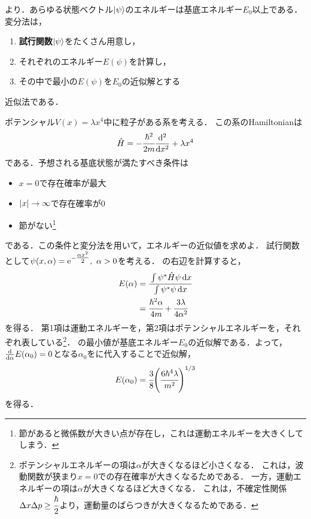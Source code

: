 \documentclass{report}
\begin{document}
  より．あらゆる状態ベクトル$\ket{\psi}$のエネルギーは基底エネルギー$E_0$以上である．
  変分法は，
  \begin{screen}
    \begin{enumerate}
      \item \textbf{試行関数}$\ket{\psi}$をたくさん用意し，
      \item それぞれのエネルギー$E(\psi)$を計算し，
      \item その中で最小の$E(\psi)$を$E_0$の近似解とする
    \end{enumerate}
  \end{screen}
  近似法である．
  \begin{myex}{}{}
    ポテンシャル$V(x)=\lambda x^4$中に粒子がある系を考える．
    この系のHamiltonianは
    \begin{align}
      \hat{H} = -\cfrac{\hbar^2}{2m}\dv[2]{x} + \lambda x^4
    \end{align}
    である．予想される基底状態が満たすべき条件は
    \begin{itemize}
      \item $x = 0$で存在確率が最大
      \item $\abs{x} \to \infty$で存在確率が0
      \item 節がない\footnote{節があると微係数が大きい点が存在し，これは運動エネルギーを大きくしてしまう．}
    \end{itemize}
    である．この条件と変分法を用いて，エネルギーの近似値を求めよ．
    \tcblower
    試行関数として$\psi(x, \alpha) = \mathrm{e}^{-\tfrac{\alpha x^2}{2}},\ \alpha > 0$を考える．
    の右辺を計算すると，
    \begin{align}
      E(\alpha) &= \cfrac{\int \psi^{*}\hat{H}\psi \dd{x}}{\int \psi^{*}\psi \dd{x}} \label{E1} \\ 
      &= \cfrac{\hbar^2 \alpha}{4m} + \cfrac{3\lambda}{4\alpha^2}
    \end{align}
    を得る．
    第1項は運動エネルギーを，第2項はポテンシャルエネルギーを，それぞれ表している\footnote{
      ポテンシャルエネルギーの項は$\alpha$が大きくなるほど小さくなる．
      これは，波動関数が狭まり$x=0$での存在確率が大きくなるためである．
      一方，運動エネルギーの項は$\alpha$が大きくなるほど大きくなる．
      これは，不確定性関係$\Delta x\Delta p \geq \cfrac{\hbar}{2}$より，運動量のばらつきが大きくなるためである．
    }．
    の最小値が基底エネルギー$E_0$の近似解である．よって，$\dv{\alpha}E(\alpha_0) = 0$となる$\alpha_0$をに代入することで近似解，
    \begin{align}
      E(\alpha_0) = \cfrac{3}{8}\qty(\cfrac{6\hbar^4\lambda}{m^2})^{1/3}
    \end{align}
    を得る．
  \end{myex}
\end{document}
